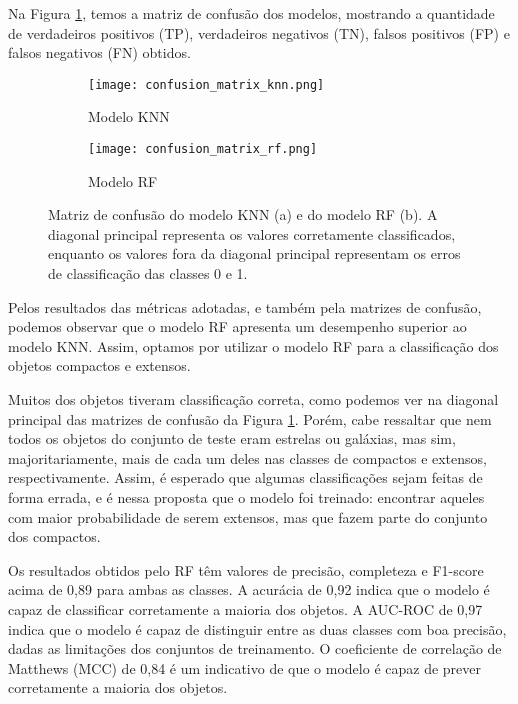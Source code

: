 Na Figura \ref{confusion_matrix}, temos a matriz de confusão dos modelos, mostrando a quantidade de verdadeiros positivos (TP), verdadeiros negativos (TN), falsos positivos (FP) e falsos negativos (FN) obtidos.

\begin{figure}[!ht]
    \centering
    \captionsetup{justification=centering}
    \begin{subfigure}[b]{0.45\textwidth}
        \texttt{[image: confusion\_matrix\_knn.png]}
        \caption{Modelo KNN}
    \end{subfigure}
    \begin{subfigure}[b]{0.45\textwidth}
        \texttt{[image: confusion\_matrix\_rf.png]}
        \caption{Modelo RF}
    \end{subfigure}
    \caption{Matriz de confusão do modelo KNN (a) e do modelo RF (b). A diagonal principal representa os valores corretamente classificados, enquanto os valores fora da diagonal principal representam os erros de classificação das classes 0 e 1.}
    \label{confusion_matrix}
\end{figure}

Pelos resultados das métricas adotadas, e também pela matrizes de confusão, podemos observar que o modelo RF apresenta um desempenho superior ao modelo KNN. Assim, optamos por utilizar o modelo RF para a classificação dos objetos compactos e extensos.

Muitos dos objetos tiveram classificação correta, como podemos ver na diagonal principal das matrizes de confusão da Figura \ref{confusion_matrix}. Porém, cabe ressaltar que nem todos os objetos do conjunto de teste eram estrelas ou galáxias, mas sim, majoritariamente, mais de cada um deles nas classes de compactos e extensos, respectivamente. Assim, é esperado que algumas classificações sejam feitas de forma errada, e é nessa proposta que o modelo foi treinado: encontrar aqueles com maior probabilidade de serem extensos, mas que fazem parte do conjunto dos compactos.

Os resultados obtidos pelo RF têm valores de precisão, completeza e F1-score acima de 0,89 para ambas as classes. A acurácia de 0,92 indica que o modelo é capaz de classificar corretamente a maioria dos objetos. A AUC-ROC de 0,97 indica que o modelo é capaz de distinguir entre as duas classes com boa precisão, dadas as limitações dos conjuntos de treinamento. O coeficiente de correlação de Matthews (MCC) de 0,84 é um indicativo de que o modelo é capaz de prever corretamente a maioria dos objetos.

